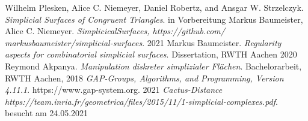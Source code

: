 \documentclass[12pt,titlepage,twoside,cleardoublepage]{article}
\theoremstyle{nummermitklammern}
\newtheorem{lemma}[temp]{Lemma}
\newtheorem{bsp}[temp]{Beispiel}
\newtheorem{bemerkung}[temp]{Bemerkung}
\newtheorem{lemma}[zahl]{Lemma}
\newtheorem{bsp}[zahl]{Beispiel}
\newtheorem{bemerkung}[zahl]{Bemerkung}
\numberwithin{equation}{section}
\DeclareMathOperator{\Aut}{Aut}
\begin{document}

\newpage
\begin{thebibliography}{9}
Wilhelm Plesken, Alice C. Niemeyer, Daniel Robertz, and Ansgar W. Strzelczyk.
\textit{Simplicial Surfaces of Congruent Triangles}.
in Vorbereitung
Markus Baumeister, Alice C. Niemeyer. \textit{SimplicicalSurfaces,
 https://github.com/} \textit{markusbaumeister/simplicial-surfaces}. 2021
Markus Baumeister. \textit{Regularity aspects for combinatorial simplicial surfaces}. Dissertation, RWTH Aachen 2020
 Reymond Akpanya. \textit{Manipulation diskreter simplizialer Flächen}. Bachelorarbeit, RWTH Aachen, 2018
 \textit{GAP-Groups, Algorithms, and Programming, Version 4.11.1}. https://www.gap-system.org. 2021
 \textit{Cactus-Distance}
	\textit{https://team.inria.fr/geometrica/files/2015/11/1-simplicial-complexes.pdf}. besucht am 24.05.2021
\end{thebibliography}
\end{document}

